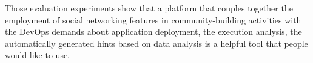 Those evaluation experiments show that a platform that couples together the employment of social networking features in community-building activities with the DevOps demands about application deployment, the execution analysis, the automatically generated hints based on data analysis is a helpful tool that people would like to use.